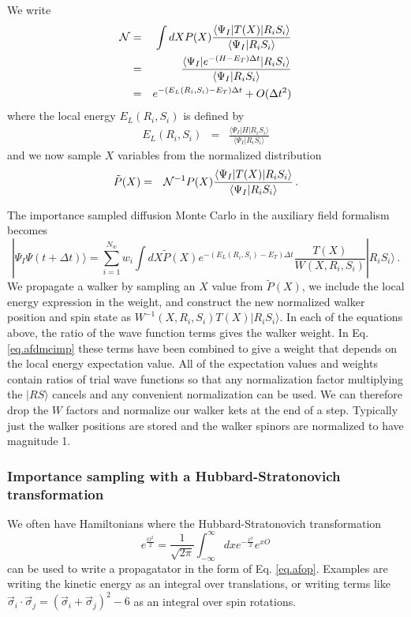 We write
\begin{eqnarray}
{\cal N} &=& \int dX P(X)\frac{\langle \Psi_I|T(X)|R_iS_i\rangle}
{\langle \Psi_I|R_iS_i\rangle}
\nonumber\\
&=& 
\frac{\langle \Psi_I|e^{-(H-E_T)\Delta t} |R_iS_i\rangle}
{\langle \Psi_I|R_iS_i\rangle}
\nonumber\\
&=& e^{-(E_L(R_i,S_i) -E_T)\Delta t} + O(\Delta t^2)
\end{eqnarray}
where the local energy $E_L(R_i,S_i)$ is defined by
\begin{eqnarray}
E_L(R_i,S_i) &=& 
\frac{\langle \Psi_I|H|R_iS_i\rangle}
{\langle \Psi_I|R_iS_i\rangle}
\end{eqnarray}
and we now sample $X$ variables from the normalized distribution
\begin{eqnarray}
\tilde P(X) &=& {\cal N}^{-1}
P(X)\frac{\langle \Psi_I|T(X)|R_iS_i\rangle}{\langle \Psi_I|R_iS_i\rangle}\,.
\end{eqnarray}


The importance sampled diffusion Monte Carlo in the auxiliary field
formalism becomes
\begin{equation}
\label{eq.afdmcimp}
|\Psi_I\Psi(t+\Delta t)\rangle = \sum_{i=1}^{N_w}
w_i \int dX \tilde P(X) e^{-(E_L(R_i,S_i) -E_T)\Delta t}
\frac{T(X)}{W(X,R_i,S_i)} |R_iS_i\rangle \,.
\end{equation}
We  propagate a walker by sampling an $X$ value from $\tilde P(X)$,
we include the local energy expression in the weight, and
construct the new normalized
walker position and spin state as $W^{-1}(X,R_i,S_i)T(X)|R_iS_i\rangle$.
In each of the equations above,
the ratio of the wave function terms gives the walker weight.
In Eq. \ref{eq.afdmcimp} these terms have been combined to give a
weight that depends on the local energy expectation value.
All of the expectation values and weights
contain ratios of trial wave functions
so that any normalization factor multiplying the $|R S\rangle$ cancels
and any convenient normalization can be used. We can therefore drop
the $W$ factors and normalize our walker kets at the end of a step.
Typically just the 
walker positions are stored and the walker spinors are normalized to
have magnitude 1.

\subsubsection{Importance sampling with a Hubbard-Stratonovich transformation}
We often have Hamiltonians where
the Hubbard-Stratonovich transformation
\begin{equation}
e^{\frac{O^2}{2}} = \frac{1}{\sqrt{2\pi}}
\int_{-\infty}^\infty dx e^{-\frac{x^2}{2}} e^{x O}
\end{equation}
can be used
to write a propagatator in the form of Eq. \ref{eq.afop}. Examples are
writing the kinetic energy as an integral over translations, or writing
terms like $\vec \sigma_i \cdot \vec \sigma_j =
(\vec \sigma_i +\vec \sigma_j)^2 -6$ as an integral over
spin rotations.

